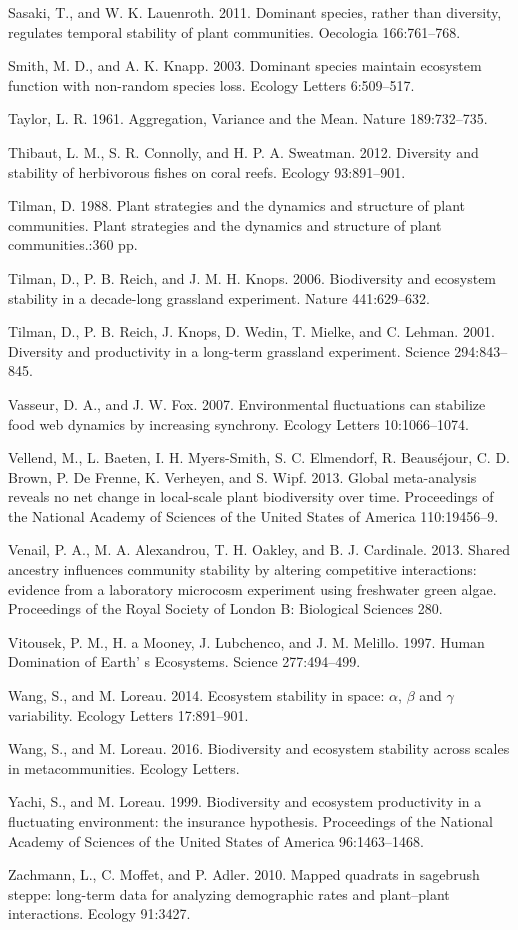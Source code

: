 \documentclass[12pt,]{article}
\begin{document}
Sasaki, T., and W. K. Lauenroth. 2011. Dominant species, rather than
diversity, regulates temporal stability of plant communities. Oecologia
166:761--768.

Smith, M. D., and A. K. Knapp. 2003. Dominant species maintain ecosystem
function with non-random species loss. Ecology Letters 6:509--517.

Taylor, L. R. 1961. Aggregation, Variance and the Mean. Nature
189:732--735.

Thibaut, L. M., S. R. Connolly, and H. P. A. Sweatman. 2012. Diversity
and stability of herbivorous fishes on coral reefs. Ecology 93:891--901.

Tilman, D. 1988. Plant strategies and the dynamics and structure of
plant communities. Plant strategies and the dynamics and structure of
plant communities.:360 pp.

Tilman, D., P. B. Reich, and J. M. H. Knops. 2006. Biodiversity and
ecosystem stability in a decade-long grassland experiment. Nature
441:629--632.

Tilman, D., P. B. Reich, J. Knops, D. Wedin, T. Mielke, and C. Lehman.
2001. Diversity and productivity in a long-term grassland experiment.
Science 294:843--845.

Vasseur, D. A., and J. W. Fox. 2007. Environmental fluctuations can
stabilize food web dynamics by increasing synchrony. Ecology Letters
10:1066--1074.

Vellend, M., L. Baeten, I. H. Myers-Smith, S. C. Elmendorf, R.
Beaus{é}jour, C. D. Brown, P. {De Frenne}, K. Verheyen, and S. Wipf.
2013. Global meta-analysis reveals no net change in local-scale plant
biodiversity over time. Proceedings of the National Academy of Sciences
of the United States of America 110:19456--9.

Venail, P. A., M. A. Alexandrou, T. H. Oakley, and B. J. Cardinale.
2013. Shared ancestry influences community stability by altering
competitive interactions: evidence from a laboratory microcosm
experiment using freshwater green algae. Proceedings of the Royal
Society of London B: Biological Sciences 280.

Vitousek, P. M., H. a Mooney, J. Lubchenco, and J. M. Melillo. 1997.
Human Domination of Earth' s Ecosystems. Science 277:494--499.

Wang, S., and M. Loreau. 2014. Ecosystem stability in space: \(\alpha\),
\(\beta\) and \(\gamma\) variability. Ecology Letters 17:891--901.

Wang, S., and M. Loreau. 2016. Biodiversity and ecosystem stability
across scales in metacommunities. Ecology Letters.

Yachi, S., and M. Loreau. 1999. Biodiversity and ecosystem productivity
in a fluctuating environment: the insurance hypothesis. Proceedings of
the National Academy of Sciences of the United States of America
96:1463--1468.

Zachmann, L., C. Moffet, and P. Adler. 2010. Mapped quadrats in
sagebrush steppe: long-term data for analyzing demographic rates and
plant--plant interactions. Ecology 91:3427.
\end{document}
